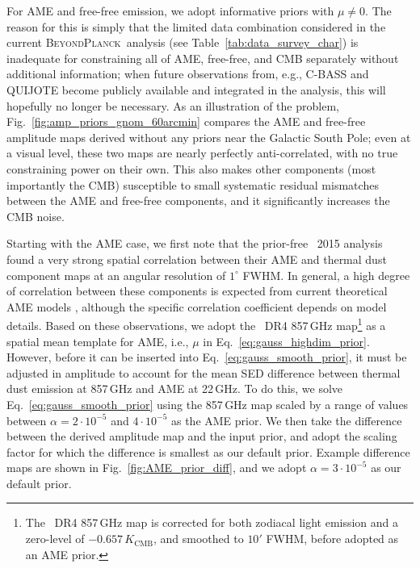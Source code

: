 \documentclass[twocolumn]{aa}
\newcommand{\BP}{\textsc{BeyondPlanck}}
\begin{document}
For AME and free-free emission, we adopt informative priors with $\mu
\ne 0$. The reason for this is simply that the limited data
combination considered in the current \BP\ analysis (see
Table~\ref{tab:data_survey_char}) is inadequate for constraining all
of AME, free-free, and CMB separately without additional information;
when future observations from, e.g., C-BASS \citep{king2010} and
QUIJOTE \citep{QUIJOTE_I_2015} become publicly available and
integrated in the analysis, this will hopefully no longer be
necessary. As an illustration of the problem,
Fig.~\ref{fig:amp_priors_gnom_60arcmin} compares the AME and free-free
amplitude maps derived without any priors near the Galactic South
Pole; even at a visual level, these two maps are nearly perfectly
anti-correlated, with no true constraining power on their own. This
also makes other components (most importantly the CMB) susceptible to
small systematic residual mismatches between the AME and free-free
components, and it significantly increases the CMB noise.

Starting with the AME case, we first note that the prior-free
\Planck\ 2015 analysis \citep{planck2014-a12} found a very strong
spatial correlation between their AME and thermal dust component maps at an
angular resolution of $1^\circ$ FWHM. In general, a high degree of
correlation between these components is expected from current
theoretical AME models
\citep[e.g.,][]{erickson:1957,draine:1998,ali-haimoud:2010,
  silsbee:2011,Hensley2020}, although the specific correlation
coefficient depends on model details. Based on these observations, we
adopt the \Planck\ DR4 857\,GHz map\footnote{The \Planck\ DR4 857\,GHz
  map is corrected for both zodiacal light emission and a zero-level
  of $-0.657\,K_{\mathrm{CMB}}$, and smoothed to $10'$ FWHM, before
  adopted as an AME prior.} \citep{npipe} as a spatial mean template
for AME, i.e., $\mu$ in Eq.~\eqref{eq:gauss_highdim_prior}.
However, before it can be inserted into
Eq.~\eqref{eq:gauss_smooth_prior}, it must be adjusted in amplitude to
account for the mean SED difference between thermal dust emission at
857\,GHz and AME at 22\,GHz. To do this, we solve
Eq.~\eqref{eq:gauss_smooth_prior} using the 857\,GHz map scaled by a
range of values between $\alpha=2\cdot10^{-5}$ and $4\cdot10^{-5}$ as
the AME prior. We then take the difference between the derived
amplitude map and the input prior, and adopt the scaling factor for
which the difference is smallest as our default prior. Example
difference maps are shown in Fig.~\ref{fig:AME_prior_diff}, and we
adopt $\alpha = 3\cdot10^{-5}$ as our default prior.
\end{document}
